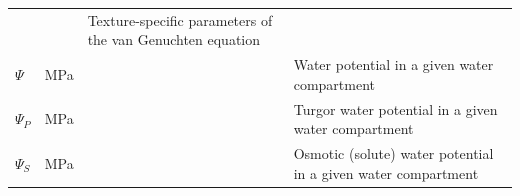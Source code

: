 \documentclass[]{book}
\begin{document}
\begin{longtable}[]{@{}llll@{}}
\begin{minipage}[t]{0.10\columnwidth}
\strut
\end{minipage} & \begin{minipage}[t]{0.12\columnwidth}\raggedright\strut
\strut
\end{minipage} & \begin{minipage}[t]{0.45\columnwidth}\raggedright\strut
Texture-specific parameters of the van Genuchten equation\strut
\end{minipage}\tabularnewline
\begin{minipage}[t]{0.11\columnwidth}\raggedright\strut
\(\Psi\)\strut
\end{minipage} & \begin{minipage}[t]{0.10\columnwidth}\raggedright\strut
MPa\strut
\end{minipage} & \begin{minipage}[t]{0.12\columnwidth}\raggedright\strut
\strut
\end{minipage} & \begin{minipage}[t]{0.45\columnwidth}\raggedright\strut
Water potential in a given water compartment\strut
\end{minipage}\tabularnewline
\begin{minipage}[t]{0.11\columnwidth}\raggedright\strut
\(\Psi_P\)\strut
\end{minipage} & \begin{minipage}[t]{0.10\columnwidth}\raggedright\strut
MPa\strut
\end{minipage} & \begin{minipage}[t]{0.12\columnwidth}\raggedright\strut
\strut
\end{minipage} & \begin{minipage}[t]{0.45\columnwidth}\raggedright\strut
Turgor water potential in a given water compartment\strut
\end{minipage}\tabularnewline
\begin{minipage}[t]{0.11\columnwidth}\raggedright\strut
\(\Psi_S\)\strut
\end{minipage} & \begin{minipage}[t]{0.10\columnwidth}\raggedright\strut
MPa\strut
\end{minipage} & \begin{minipage}[t]{0.12\columnwidth}\raggedright\strut
\strut
\end{minipage} & \begin{minipage}[t]{0.45\columnwidth}\raggedright\strut
Osmotic (solute) water potential in a given water compartment\strut
\end{minipage}\tabularnewline

\end{longtable}
\end{document}
